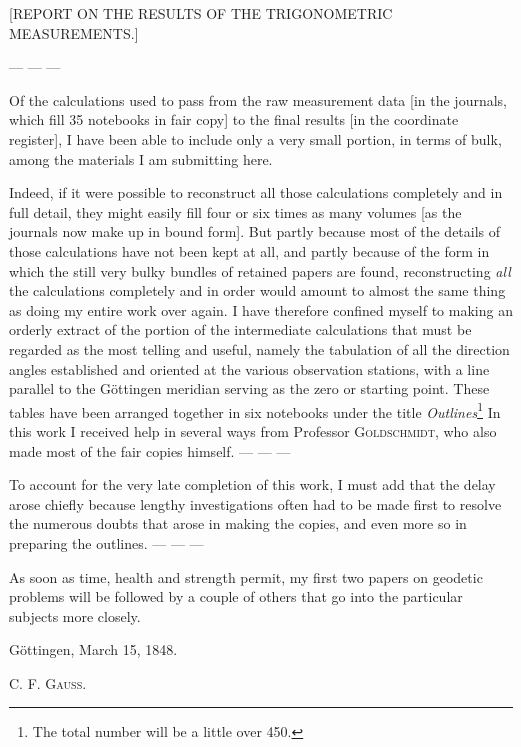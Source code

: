 \clearpage
{}%
\begin{center}\large [REPORT ON THE RESULTS OF THE TRIGONOMETRIC MEASUREMENTS.]\end{center}
\par
— — —

Of the calculations used to pass from the raw measurement data [in the journals, which fill 35 notebooks in fair copy] to the final results [in the coordinate register], I have been able to include only a very small portion, in terms of bulk, among the materials I am submitting here.

Indeed, if it were possible to reconstruct all those calculations completely and in full detail, they might easily fill four or six times as many volumes [as the journals now make up in bound form]. But partly because most of the details of those calculations have not been kept at all, and partly because of the form in which the still very bulky bundles of retained papers are found, reconstructing \textit{all} the calculations completely and in order would amount to almost the same thing as doing my entire work over again. I have therefore confined myself to making an orderly extract of the portion of the intermediate calculations that must be regarded as the most telling and useful, namely the tabulation of all the direction angles established and oriented at the various observation stations, with a line parallel to the Göttingen meridian serving as the zero or starting point. These tables have been arranged together in six notebooks under the title \textit{Outlines}\footnote{The total number will be a little over 450.} In this work I received help in several ways from Professor \textsc{Goldschmidt}, who also made most of the fair copies himself. — — —

To account for the very late completion of this work, I must add that the delay arose chiefly because lengthy investigations often had to be made first to resolve the numerous doubts that arose in making the copies, and even more so in preparing the outlines. — — —

As soon as time, health and strength permit, my first two papers on geodetic problems will be followed by a couple of others that go into the particular subjects more closely.

Göttingen, March 15, 1848.
\begin{flushright}C. F. \textsc{Gauss}.\end{flushright}
